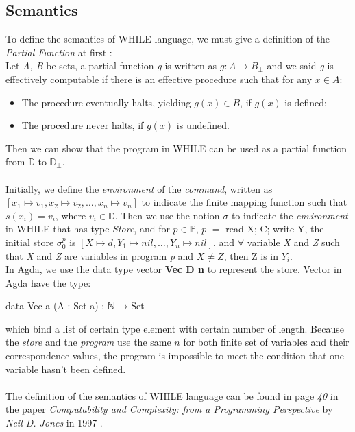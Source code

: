 \documentclass{jfrarticle}
\begin{document}
\subsection{Semantics}
To define the semantics of WHILE language, we must give a definition of the \textit{Partial Function} at first \cite{jones_computability_1997}:\\
Let \textit{A, B} be sets, a partial function \textit{g} is written as $g: A \rightarrow B_\bot$ and we said \textit{g} is effectively computable if there is an effective procedure such that for any $x \in A$:
\begin{itemize}
  \item The procedure eventually halts, yielding $g(x) \in B$, if $g(x)$ is defined;
  \item The procedure never halts, if $g(x)$ is undefined.
\end{itemize}
Then we can show that the program in WHILE can be used as a partial function from $\mathds{D}$ to $\mathds{D}_\bot$.\\\\
Initially, we define the \textit{environment} of the \textit{command}, written as $[x_1 \mapsto v_1, x_2 \mapsto v_2, \dots,x_n \mapsto v_n]$ to indicate the finite mapping function such that $s(x_i) = v_i$, where $v_i \in \mathds{D}$.
Then we use the notion $\sigma$ to indicate the \textit{environment} in WHILE that has type \textit{Store},
and for $p \in \mathds{P}$, $p$ $=$ read X; C; write Y, the initial store $\sigma_0^p$ is $[X \mapsto d, Y_1 \mapsto nil, \dots,Y_n \mapsto nil]$, and $\forall$ variable \textit{X} and \textit{Z} such that \textit{X} and \textit{Z} are variables in program \textit{p} and $X \neq Z$, then Z is in $Y_i$.\\
In Agda, we use the data type vector \textbf{Vec D n} to represent the store. Vector in Agda have the type:
\begin{code}
data Vec {a} (A : Set a) : ℕ → Set
\end{code}
which bind a list of certain type element with certain number of length.
Because the \textit{store} and the \textit{program} use the same $\textit{n}$ for both finite set of variables and their correspondence values,
the program is impossible to meet the condition that one variable hasn't been defined.\\\\
The definition of the semantics of WHILE language can be found in page \textit{40} in the paper \textit{Computability and Complexity: from a Programming Perspective} by \textit{Neil D. Jones} in 1997 \cite{jones_computability_1997}.\\\\
\end{document}
